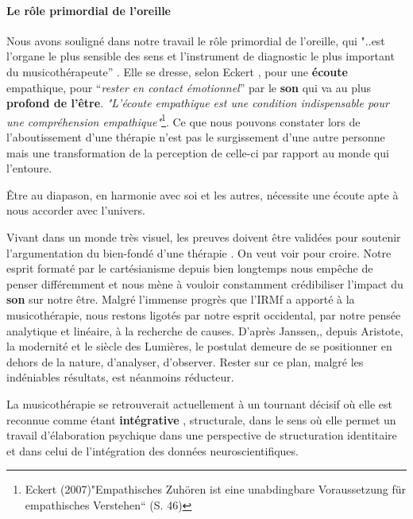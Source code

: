 \paragraph{Le rôle primordial de l'oreille}




Nous avons souligné dans notre travail le rôle primordial de
l'oreille, qui "..est l'organe le plus sensible des
sens et l'instrument de diagnostic le plus important du
musicothérapeute'' \autocite{seminar_zuerich}.
Elle se dresse, selon Eckert \autocite{seminar_zuerich}, pour une\textbf{ écoute} empathique, pour ``\textit{rester en contact émotionnel}'' par le \textbf{son} qui va au plus \textbf{profond de
  l'être}. \textit{"L'écoute empathique est une condition indispensable
  pour une compréhension empathique"}\footnote{Eckert (2007)"Empathisches Zuhören ist eine unabdingbare Voraussetzung für empathisches Verstehen“ (S. 46)}.
Ce que nous pouvons constater lors de l'aboutissement
d'une thérapie n'est pas le surgissement d'une autre personne mais une transformation
de la perception de celle-ci par rapport au monde qui l'entoure.


Être au diapason, en harmonie avec soi et les autres, nécessite une
écoute apte à nous accorder avec l'univers.

Vivant dans un monde très visuel, les preuves doivent être
validées pour soutenir l'argumentation du bien-fondé d'une thérapie
\autocite[ch. II, pp. 105--106 ]{vrait_musicotherapie_2018}.
      On veut voir pour croire.
Notre esprit formaté par le cartésianisme depuis bien longtemps nous
empêche de penser différemment
et nous mène à vouloir constamment crédibiliser l'impact
du \textbf{son} sur notre être.
Malgré l'immense progrès que l'IRMf a apporté à la musicothérapie, nous restons
  ligotés par notre esprit occidental, par
  notre pensée analytique et linéaire, à la recherche de
  causes.
  D'après Janssen,\autocite[201]{van_eersel_cerveau}, depuis Aristote, la modernité et le
siècle des Lumières, le postulat demeure de se positionner en dehors
de la nature, d'analyser, d'observer.
Rester sur ce plan, malgré les
indéniables résultats, est néanmoins
réducteur.

La musicothérapie  se retrouverait actuellement
 à un tournant décisif où elle est reconnue comme étant
 \textbf{ intégrative} \autocite[ch. III, p. 53,
 105]{vrait_musicotherapie_2018},
struc\-tu\-rale, dans le sens où elle permet un travail d'élaboration psychique dans une perspective de structuration identitaire  et dans celui de l'intégration des données neuroscientifiques.

